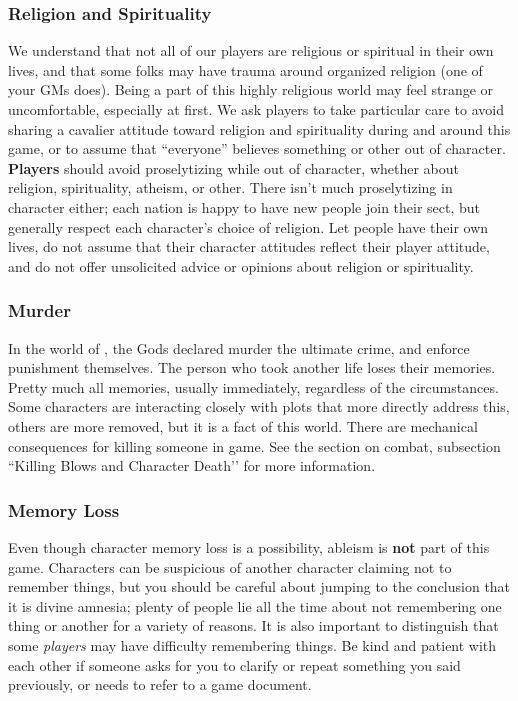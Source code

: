 \documentclass[sheet]{GL2020}
\begin{document}
\subsubsection{Religion and Spirituality}
We understand that not all of our players are religious or spiritual in their own lives, and that some folks may have trauma around organized religion (one of your GMs does). Being a part of this highly religious world may feel strange or uncomfortable, especially at first. We ask players to take particular care to avoid sharing a cavalier attitude toward religion and spirituality during and around this game, or to assume that ``everyone'' believes something or other out of character. \textbf{Players} should avoid proselytizing while out of character, whether about religion, spirituality, atheism, or other. There isn't much proselytizing in character either; each nation is happy to have new people join their sect, but generally respect each character's choice of religion. Let people have their own lives, do not assume that their character attitudes reflect their player attitude, and do not offer unsolicited advice or opinions about religion or spirituality.

\subsubsection{Murder}
In the world of \pEarth{}, the Gods declared murder the ultimate crime, and enforce punishment themselves. The person who took another life loses their memories. Pretty much all memories, usually immediately, regardless of the circumstances. Some characters are interacting closely with plots that more directly address this, others are more removed, but it is a fact of this world. There are mechanical consequences for killing someone in game. See the section on combat, subsection ``Killing Blows and Character Death’’ for more information.

\subsubsection{Memory Loss}
Even though character memory loss is a possibility, ableism is \textbf{not} part of this game. Characters can be suspicious of another character claiming not to remember things, but you should be careful about jumping to the conclusion that it is divine amnesia; plenty of people lie all the time about not remembering one thing or another for a variety of reasons. It is also important to distinguish that some \emph{players} may have difficulty remembering things. Be kind and patient with each other if someone asks for you to clarify or repeat something you said previously, or needs to refer to a game document.
\end{document}

